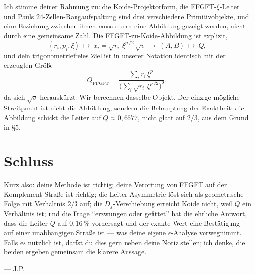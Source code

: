 Ich stimme deiner Rahmung zu: die Koide-Projektorform, die
FFGFT-$\xi$-Leiter und Pauls $24$-Zellen-Rangaufspaltung sind drei
verschiedene Primitivobjekte, und eine Beziehung zwischen ihnen muss durch
eine Abbildung gezeigt werden, nicht durch eine gemeinsame Zahl. Die
FFGFT-zu-Koide-Abbildung ist explizit,
\[
  (r_i, p_i, \xi)\ \longmapsto\ x_i = \sqrt{r_i}\,\xi^{p_i/2}\,\sqrt{v}
  \ \longmapsto\ (A, B)\ \longmapsto\ Q,
\]
und dein trigonometriefreies Ziel ist in unserer Notation identisch mit der
erzeugten Größe
\[
  Q_{\text{FFGFT}} =
  \frac{\sum_i r_i\,\xi^{p_i}}{\big(\sum_i \sqrt{r_i}\,\xi^{p_i/2}\big)^2},
\]
da sich $\sqrt{v}$ herauskürzt. Wir berechnen dasselbe Objekt. Der einzige
mögliche Streitpunkt ist nicht die Abbildung, sondern die Behauptung der
Exaktheit: die Abbildung schickt die Leiter auf $Q \approx 0{,}6677$, nicht
glatt auf $2/3$, aus dem Grund in \S5.

\section{Schluss}

Kurz also: deine Methode ist richtig; deine Verortung von FFGFT auf der
Komplement-Straße ist richtig; die Leiter-Asymmetrie löst sich als
geometrische Folge mit Verhältnis $2/3$ auf; die $D_f$-Verschiebung erreicht
Koide nicht, weil $Q$ ein Verhältnis ist; und die Frage ``erzwungen oder
gefittet'' hat die ehrliche Antwort, dass die Leiter $Q$ auf $0{,}16\,\%$
vorhersagt und der exakte Wert eine Bestätigung auf einer unabhängigen
Straße ist --- was deine eigene $\epsilon$-Analyse vorwegnimmt. Falls es
nützlich ist, darfst du dies gern neben deine Notiz stellen; ich denke, die
beiden ergeben gemeinsam die klarere Aussage.

\begin{flushright}\small
--- J.P.
\end{flushright}
